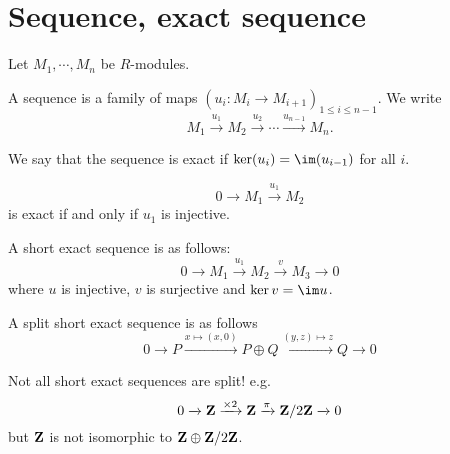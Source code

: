 \section{Sequence, exact sequence}

Let $M_1, \cdots, M_n$ be $R$-modules.

\begin{dfn}
    A sequence is a family of maps $(u_i : M_i \longrightarrow  M_{i+1})_{1\leq i\leq n-1}$. We write \[M_1\xrightarrow{u_1} M_2 \xrightarrow{u_2}\cdots \xrightarrow{u_{n-1}}M_n.\]

    We say that the sequence is exact if $\ker (u_{i})=\im(u_{i-1})$ for all $i$.
\end{dfn}

\begin{ex}
\[
    0 \xrightarrow{} M_1 \xrightarrow{u_1} M_2
\] 
is exact if and only if $u_1$ is injective.
\end{ex}

\begin{dfn}
    A short exact sequence is as follows: \[0 \xrightarrow{} M_1 \xrightarrow{u_1} M_2\xrightarrow{v}M_3 \xrightarrow{}0\] where $u$ is injective, $v$ is surjective and $\ker v=\im u$.
\end{dfn}

\begin{dfn}
    A split short exact sequence is as follows \[0 \xrightarrow{} P \xrightarrow{x\mapsto (x,0)} P\oplus Q \xrightarrow{(y,z)\mapsto z}Q \xrightarrow{}0\]
\end{dfn}

\begin{rem}
    Not all short exact sequences are split! e.g. \[0 \xrightarrow{} \mathbf Z \xrightarrow{\times 2}\mathbf Z \xrightarrow{\pi} \mathbf Z /2 \mathbf Z \xrightarrow{} 0\] but $\mathbf Z$ is not isomorphic to $\mathbf Z \oplus \mathbf Z / 2\mathbf Z$.
\end{rem}

